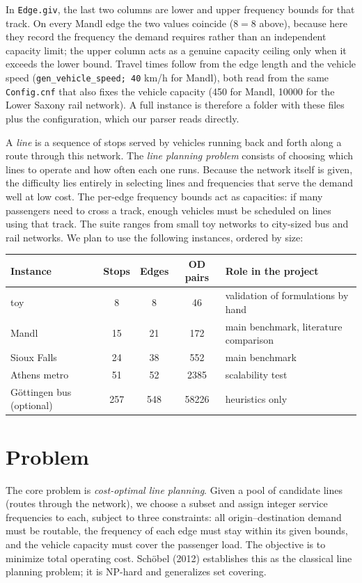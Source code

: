 \documentclass[11pt]{article}
\begin{document}
\noindent In \texttt{Edge.giv}, the last two columns are lower and upper frequency bounds for that track. On every Mandl edge the two values coincide ($8 = 8$ above), because here they record the frequency the demand requires rather than an independent capacity limit; the upper column acts as a genuine capacity ceiling only when it exceeds the lower bound. Travel times follow from the edge length and the vehicle speed (\texttt{gen\_vehicle\_speed; 40} km/h for Mandl), both read from the same \texttt{Config.cnf} that also fixes the vehicle capacity (450 for Mandl, 10000 for the Lower Saxony rail network). A full instance is therefore a folder with these files plus the configuration, which our parser reads directly.

A \emph{line} is a sequence of stops served by vehicles running back and forth along a route through this network. The \emph{line planning problem} consists of choosing which lines to operate and how often each one runs. Because the network itself is given, the difficulty lies entirely in selecting lines and frequencies that serve the demand well at low cost. The per-edge frequency bounds act as capacities: if many passengers need to cross a track, enough vehicles must be scheduled on lines using that track. The suite ranges from small toy networks to city-sized bus and rail networks. We plan to use the following instances, ordered by size:

\begin{center}
\begin{tabular}{lcccl}
\toprule
Instance & Stops & Edges & OD pairs & Role in the project \\
\midrule
toy & 8 & 8 & 46 & validation of formulations by hand \\
Mandl & 15 & 21 & 172 & main benchmark, literature comparison \\
Sioux Falls & 24 & 38 & 552 & main benchmark \\
Athens metro & 51 & 52 & 2385 & scalability test \\
G\"ottingen bus (optional) & 257 & 548 & 58226 & heuristics only \\
\bottomrule
\end{tabular}
\end{center}

\section{Problem}

The core problem is \emph{cost-optimal line planning}. Given a pool of candidate lines (routes through the network), we choose a subset and assign integer service frequencies to each, subject to three constraints: all origin--destination demand must be routable, the frequency of each edge must stay within its given bounds, and the vehicle capacity must cover the passenger load. The objective is to minimize total operating cost. Sch\"obel (2012) establishes this as the classical line planning problem; it is NP-hard and generalizes set covering.
\end{document}
